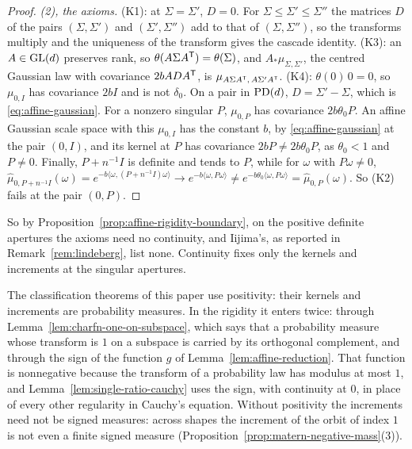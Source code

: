 \begin{proof}
\emph{(2), the axioms.} (K1): at $\Sigma = \Sigma'$, $D = 0$. For $\Sigma \le \Sigma' \le \Sigma''$ the
matrices $D$ of the pairs $(\Sigma, \Sigma')$ and $(\Sigma', \Sigma'')$ add to that of $(\Sigma, \Sigma'')$, so the
transforms multiply and the uniqueness of the transform gives the cascade identity. (K3): an $A \in \mathrm{GL}(d)$
preserves rank, so $\theta(A\Sigma A^{\mathsf{T}}) = \theta(\Sigma)$, and $A_*\mu_{\Sigma,\Sigma'}$, the centred Gaussian
law with covariance $2bADA^{\mathsf{T}}$, is $\mu_{A\Sigma A^{\mathsf{T}},\,A\Sigma'A^{\mathsf{T}}}$. (K4): $\theta(0)\,0 = 0$, so
$\mu_{0,I}$ has covariance $2bI$ and is not $\delta_0$. On a pair in $\mathrm{PD}(d)$, $D = \Sigma' - \Sigma$, which is
\ref{eq:affine-gaussian}. For a nonzero singular $P$, $\mu_{0,P}$ has covariance $2b\theta_0P$. An affine Gaussian scale space
with this $\mu_{0,I}$ has the constant $b$, by \ref{eq:affine-gaussian} at the pair $(0, I)$, and its kernel at $P$
has covariance $2bP \ne 2b\theta_0P$, as $\theta_0 < 1$ and $P \ne 0$. Finally, $P + n^{-1}I$ is
definite and tends to $P$, while for $\omega$ with $P\omega \ne 0$,
$\widehat\mu_{0,P+n^{-1}I}(\omega) = e^{-b\langle\omega,(P+n^{-1}I)\omega\rangle} \to e^{-b\langle\omega,P\omega\rangle}
\ne e^{-b\theta_0\langle\omega,P\omega\rangle} = \widehat\mu_{0,P}(\omega)$. So (K2) fails at the pair $(0, P)$.
\end{proof}

So by Proposition~\ref{prop:affine-rigidity-boundary}, on the positive definite apertures the axioms need no
continuity, and Iijima's, as reported in
Remark~\ref{rem:lindeberg}, list none. Continuity fixes only the kernels and increments at the singular
apertures.

\begin{remark}\label{rem:positivity}
The classification theorems of this paper use positivity: their kernels and increments are probability
measures. In the rigidity it enters twice: through
Lemma~\ref{lem:charfn-one-on-subspace}, which says that a probability measure whose transform is $1$ on a
subspace is carried by its orthogonal complement, and through the sign of the function $g$ of
Lemma~\ref{lem:affine-reduction}. That function is nonnegative because the transform of a probability
law has modulus at most $1$, and Lemma~\ref{lem:single-ratio-cauchy} uses the sign, with continuity at
$0$, in place of every other regularity in Cauchy's equation. Without
positivity the increments need not be signed measures: across shapes the increment of the \Matern{} orbit of
index $1$ is not even a finite signed measure (Proposition~\ref{prop:matern-negative-mass}(3)).
\end{remark}

